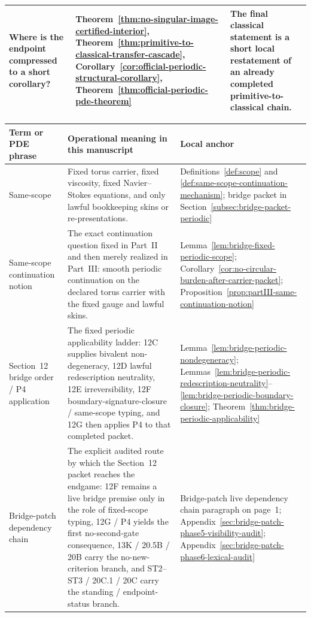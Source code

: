 \begin{tcolorbox}[title={Theorem map for a first audit pass (continued)}, colback=blue!2!white, colframe=blue!55!black, boxsep=1pt, left=2pt, right=2pt, top=2pt, bottom=2pt]
\begin{tabularx}{\textwidth}{@{}L{0.28\textwidth}L{0.32\textwidth}Y@{}}
Where is the endpoint compressed to a short corollary? & Theorem~\ref{thm:no-singular-image-certified-interior}, Theorem~\ref{thm:primitive-to-classical-transfer-cascade}, Corollary~\ref{cor:official-periodic-structural-corollary}, Theorem~\ref{thm:official-periodic-pde-theorem} & The final classical statement is a short local restatement of an already completed primitive-to-classical chain.\\
\bottomrule
\end{tabularx}
\end{tcolorbox}

\begin{tcolorbox}[title={Compact glossary and PDE-language crosswalk}, colback=green!2!white, colframe=green!45!black, boxsep=1pt, left=2pt, right=2pt, top=2pt, bottom=2pt]
\scriptsize
\renewcommand{\arraystretch}{1.05}
\setlength{\tabcolsep}{2.8pt}
\begin{tabularx}{\textwidth}{@{}L{0.22\textwidth}L{0.35\textwidth}Y@{}}
\toprule
\textbf{Term or PDE phrase} & \textbf{Operational meaning in this manuscript} & \textbf{Local anchor}\\
\midrule
Same-scope & Fixed torus carrier, fixed viscosity, fixed Navier--Stokes equations, and only lawful bookkeeping skins or re-presentations. & Definitions~\ref{def:scope} and \ref{def:same-scope-continuation-mechanism}; bridge packet in Section~\ref{subsec:bridge-packet-periodic}\\
Same-scope continuation notion & The exact continuation question fixed in Part~II and then merely realized in Part~III: smooth periodic continuation on the declared torus carrier with the fixed gauge and lawful skins. & Lemma~\ref{lem:bridge-fixed-periodic-scope}; Corollary~\ref{cor:no-circular-burden-after-carrier-packet}; Proposition~\ref{prop:partIII-same-continuation-notion}\\
Section~12 bridge order / P4 application & The fixed periodic applicability ladder: 12C supplies bivalent non-degeneracy, 12D lawful redescription neutrality, 12E irreversibility, 12F boundary-signature-closure / same-scope typing, and 12G then applies P4 to that completed packet. & Lemma~\ref{lem:bridge-periodic-nondegeneracy}; Lemmas~\ref{lem:bridge-periodic-redescription-neutrality}--\ref{lem:bridge-periodic-boundary-closure}; Theorem~\ref{thm:bridge-periodic-applicability}\\
Bridge-patch dependency chain & The explicit audited route by which the Section~12 packet reaches the endgame: 12F remains a live bridge premise only in the role of fixed-scope typing, 12G / P4 yields the first no-second-gate consequence, 13K / 20.5B / 20B carry the no-new-criterion branch, and ST2--ST3 / 20C.1 / 20C carry the standing / endpoint-status branch. & Bridge-patch live dependency chain paragraph on page~1; Appendix~\ref{sec:bridge-patch-phase5-visibility-audit}; Appendix~\ref{sec:bridge-patch-phase6-lexical-audit}\\

\end{tabularx}
\end{tcolorbox}
